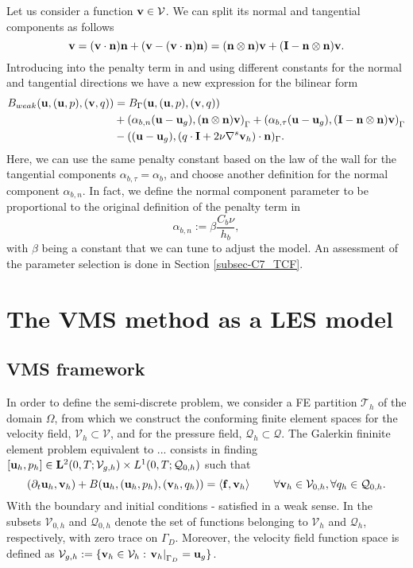 Let us consider a function $ {\bf v}\in\mathcal{V} $. We can split its normal and tangential components as follows
\begin{equation}
\label{eq-C7_v_decomposition}
{\bf v} = ({\bf v}\cdot{\bf n}){\bf n} + ({\bf v}-({\bf v}\cdot{\bf n}){\bf n})=({\bf n}\otimes{\bf n}){\bf v} + (\mathbf{I}-{\bf n}\otimes{\bf n}){\bf v}.
\end{equation}
Introducing  into the penalty term in  and using different constants for the normal and tangential directions we have a new expression for the bilinear form
\begin{align}
\label{eq-C7_bilinear_weak_by_components}
B_{weak}({\bf u},({\bf u},p),({\bf v},q))&=B_\Gamma({\bf u},({\bf u},p),({\bf v},q))\\\nonumber
&+\left(\alpha_{b,n}({\bf u}-{\bf u}_g),({\bf n}\otimes{\bf n}){\bf v}\right)_\Gamma+\left(\alpha_{b,\tau}({\bf u}-{\bf u}_g),(\mathbf{I}-{\bf n}\otimes{\bf n}){\bf v}\right)_\Gamma\\\nonumber
&-(({\bf u}-{\bf u}_g),(q\cdot\mathbf{I}+2\nu\nabla^s{\bf v}_h)\cdot{\bf n})_\Gamma.
\end{align}
Here, we can use the same penalty constant based on the law of the wall for the tangential components $\alpha_{b,\tau}=\alpha_b$, and choose another definition for the normal component $\alpha_{b,n}$. In fact, we define the normal component parameter to be proportional to the original definition of the penalty term in \cite{bazilevs_weak_laminar}
\begin{equation}
\label{eq-C7_alpha_b_n}
\alpha_{b,n}:=\beta\frac{C_b\nu}{h_b},
\end{equation} with $ \beta $ being a constant that we can tune to adjust the model. An assessment of the parameter selection is done in Section \ref{subsec-C7_TCF}.

\section{The VMS method as a LES model}
\label{sec-C7_VMS}
\subsection{VMS framework}
In order to define the semi-discrete problem, we consider a FE partition $ \mathcal{T}_h $ of the domain $ \Omega $, from which we construct the conforming finite element spaces for the velocity field, $ \mathcal{V}_h\subset\mathcal{V} $, and for the pressure field, $ \mathcal{Q}_h\subset\mathcal{Q} $. The Galerkin fininite element problem equivalent to ... consists in finding $[{\bf u}_h,p_h]\in\mathbf{L}^2(0,T;\mathcal{V}_{g,h})\times L^1(0,T;\mathcal{Q}_{0,h})$ such that
\begin{equation}
\label{eq-C7_NS_galerkin}
(\partial_t{\bf u}_h,{\bf v}_h)+B({\bf u}_h,({\bf u}_h,p_h),({\bf v}_h,q_h)) =\left<{\bf f},{\bf v}_h\right>
\quad\quad\forall{\bf v}_h\in\mathcal{V}_{0,h},\forall q_h\in\mathcal{Q}_{0,h}.
\end{equation}
With the boundary and initial conditions \Eq{}-\Eq{} satisfied in a weak sense. In  the subsets $ \mathcal{V}_{0,h} $ and $ \mathcal{Q}_{0,h} $ denote the set of functions belonging to $ \mathcal{V}_h $ and $ \mathcal{Q}_h $, respectively, with zero trace on $ \Gamma_D $. Moreover, the velocity field function space is defined as $ \mathcal{V}_{g,h}:=\lbrace{\bf v}_h\in\mathcal{V}_h: \left.{\bf v}_h\right|_{\Gamma_D}={\bf u}_g\rbrace $.

